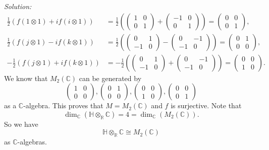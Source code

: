\documentclass[a4paper, 12pt]{article}
\newenvironment{solution}
    {\textit{Solution:}}
    {}
\begin{document}
\begin{solution}
\begin{align*}
	\frac{1}{2}(f(1\otimes 1)+if(i\otimes 1))&=\frac{1}{2}(\begin{pmatrix}
		1&0\\ 
		0&1
	\end{pmatrix}+\begin{pmatrix}
		-1&0\\ 
		0&1
	\end{pmatrix})=\begin{pmatrix}
		0&0\\
		0&1
	\end{pmatrix},\\ 
	\frac{1}{2}(f(j\otimes 1)-if(k\otimes 1))&=\frac{1}{2}(\begin{pmatrix}
		0&1\\ 
		-1&0
	\end{pmatrix}-\begin{pmatrix}
		0&-1\\ 
		-1&0
	\end{pmatrix})=\begin{pmatrix}
		0&1\\
		0&0
	\end{pmatrix},\\[5pt]
	-\frac{1}{2}(f(j\otimes 1)+if(k\otimes 1))&=-\frac{1}{2}(\begin{pmatrix}
		0&1\\ 
		-1&0
	\end{pmatrix}+\begin{pmatrix}
		0&-1\\ 
		-1&0
	\end{pmatrix})=\begin{pmatrix}
		0&0\\
		1&0
	\end{pmatrix}. 
\end{align*}
We know that \(M_2(\mathbb{C})\) can be generated by 
\[\begin{pmatrix}
	1&0\\
	0&0
\end{pmatrix},\begin{pmatrix}
	0&1\\
	0&0
\end{pmatrix},\begin{pmatrix}
	0&0\\
	1&0
\end{pmatrix},\begin{pmatrix}
	0&0\\
	0&1
\end{pmatrix}\]
as a \(\mathbb{C}\)-algebra. This proves that \(M=M_2(\mathbb{C})\) and \(f\) is surjective. Note that 
\[\dim_\mathbb{C}(\mathbb{H}\otimes_\mathbb{R}\mathbb{C})=4=\dim_\mathbb{C}(M_2(\mathbb{C})).\]
So we have 
\[\mathbb{H}\otimes_\mathbb{R}\mathbb{C}\cong M_2(\mathbb{C})\]
as \(\mathbb{C}\)-algebras.
\end{solution}
\end{document}
